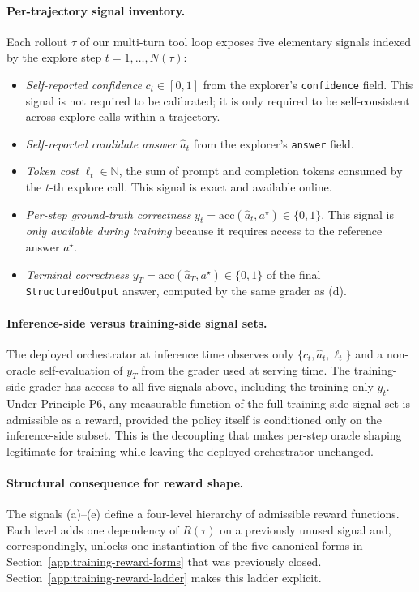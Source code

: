 \paragraph{Per-trajectory signal inventory.}
Each rollout $\tau$ of our multi-turn tool loop exposes five elementary signals indexed by the explore step $t = 1,\dots,N(\tau)$:
\begin{itemize}
\item[(a)] \emph{Self-reported confidence} $c_t \in [0,1]$ from the explorer's \texttt{confidence} field. This signal is not required to be calibrated; it is only required to be self-consistent across explore calls within a trajectory.
\item[(b)] \emph{Self-reported candidate answer} $\hat a_t$ from the explorer's \texttt{answer} field.
\item[(c)] \emph{Token cost} $\ell_t \in \mathbb{N}$, the sum of prompt and completion tokens consumed by the $t$-th explore call. This signal is exact and available online.
\item[(d)] \emph{Per-step ground-truth correctness} $y_t = \mathrm{acc}(\hat a_t, a^\star) \in \{0,1\}$. This signal is \emph{only available during training} because it requires access to the reference answer $a^\star$.
\item[(e)] \emph{Terminal correctness} $y_T = \mathrm{acc}(\hat a_T, a^\star) \in \{0,1\}$ of the final \texttt{StructuredOutput} answer, computed by the same grader as (d).
\end{itemize}

\paragraph{Inference-side versus training-side signal sets.}
The deployed orchestrator at inference time observes only $\{c_t,\hat a_t,\ell_t\}$ and a non-oracle self-evaluation of $y_T$ from the grader used at serving time. The training-side grader has access to all five signals above, including the training-only $y_t$. Under Principle P6, any measurable function of the full training-side signal set is admissible as a reward, provided the policy itself is conditioned only on the inference-side subset. This is the decoupling that makes per-step oracle shaping legitimate for training while leaving the deployed orchestrator unchanged.

\paragraph{Structural consequence for reward shape.}
The signals (a)--(e) define a four-level hierarchy of admissible reward functions. Each level adds one dependency of $R(\tau)$ on a previously unused signal and, correspondingly, unlocks one instantiation of the five canonical forms in Section~\ref{app:training-reward-forms} that was previously closed. Section~\ref{app:training-reward-ladder} makes this ladder explicit.

